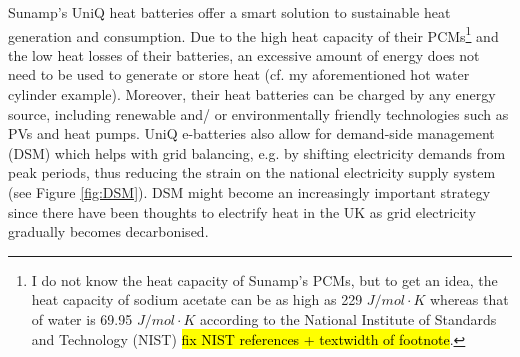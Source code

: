 Sunamp’s UniQ heat batteries offer a smart solution to sustainable heat generation and consumption.
Due to the high heat capacity of their PCMs\footnote{
	I do not know the heat capacity of Sunamp's PCMs, but to get an idea, the heat capacity of sodium acetate can be as high as 229 $J/mol \cdot K$ 
	whereas that of water is 69.95 $J/mol \cdot K$ 
	according to the National Institute of Standards and Technology (NIST) \hl{fix NIST references + textwidth of footnote}.
} and the low heat losses of their batteries, an excessive amount of energy does not need to be used to generate or store heat (cf. my aforementioned hot water cylinder example).
Moreover, their heat batteries can be charged by any energy source, including renewable and/ or environmentally friendly technologies such as PVs and heat pumps. %
UniQ e-batteries also allow for demand-side management (DSM) which helps with grid balancing, e.g. by shifting electricity demands from peak periods, thus reducing the strain on the national electricity supply system (see Figure \ref{fig:DSM}).
DSM might become an increasingly important strategy since there have been thoughts to electrify heat in the UK as grid electricity gradually becomes decarbonised.


